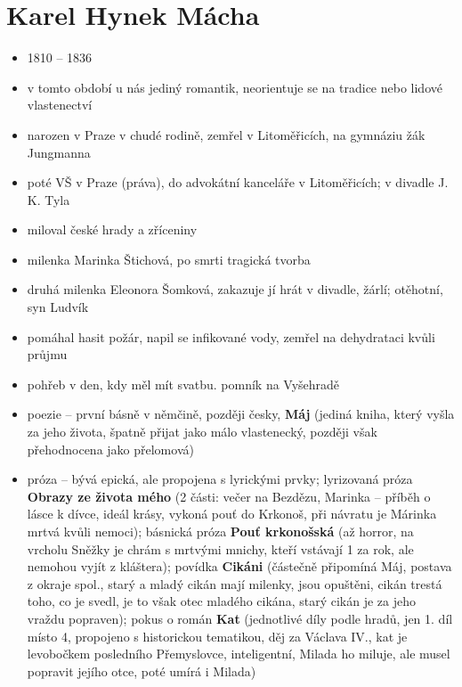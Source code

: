 \documentclass{article}
\begin{document}
\section{Karel Hynek Mácha}
\begin{itemize}
  \item 1810 -- 1836
  \item v tomto období u nás jediný romantik, neorientuje se na tradice nebo lidové vlastenectví
  \item narozen v Praze v chudé rodině, zemřel v Litoměřicích, na gymnáziu žák Jungmanna
  \item poté VŠ v Praze (práva), do advokátní kanceláře v Litoměřicích; v divadle J. K. Tyla
  \item miloval české hrady a zříceniny
  \item milenka Marinka Štichová, po smrti tragická tvorba
  \item druhá milenka Eleonora Šomková, zakazuje jí hrát v divadle, žárlí; otěhotní, syn Ludvík
  \item pomáhal hasit požár, napil se infikované vody, zemřel na dehydrataci kvůli průjmu
  \item pohřeb v den, kdy měl mít svatbu. pomník na Vyšehradě
  \item poezie -- první básně v němčině, později česky, \textbf{Máj} (jediná kniha, který vyšla za jeho života, špatně přijat jako málo vlastenecký, později však přehodnocena jako přelomová)
  \item próza -- bývá epická, ale propojena s lyrickými prvky; lyrizovaná próza \textbf{Obrazy ze života mého} (2 části: večer na Bezdězu, Marinka – příběh o lásce k dívce, ideál krásy, vykoná pouť do Krkonoš, při návratu je Márinka mrtvá kvůli nemoci); básnická próza \textbf{Pouť krkonošská} (až horror, na vrcholu Sněžky je chrám s mrtvými mnichy, kteří vstávají 1 za rok, ale nemohou vyjít z kláštera); povídka \textbf{Cikáni} (částečně připomíná Máj, postava z okraje spol., starý a mladý cikán mají milenky, jsou opuštěni, cikán trestá toho, co je svedl, je to však otec mladého cikána, starý cikán je za jeho vraždu popraven); pokus o román \textbf{Kat} (jednotlivé díly podle hradů, jen 1. díl místo 4, propojeno s historickou tematikou, děj za Václava IV., kat je levobočkem posledního Přemyslovce, inteligentní, Milada ho miluje, ale musel popravit jejího otce, poté umírá i Milada)
\end{itemize}
\end{document}
